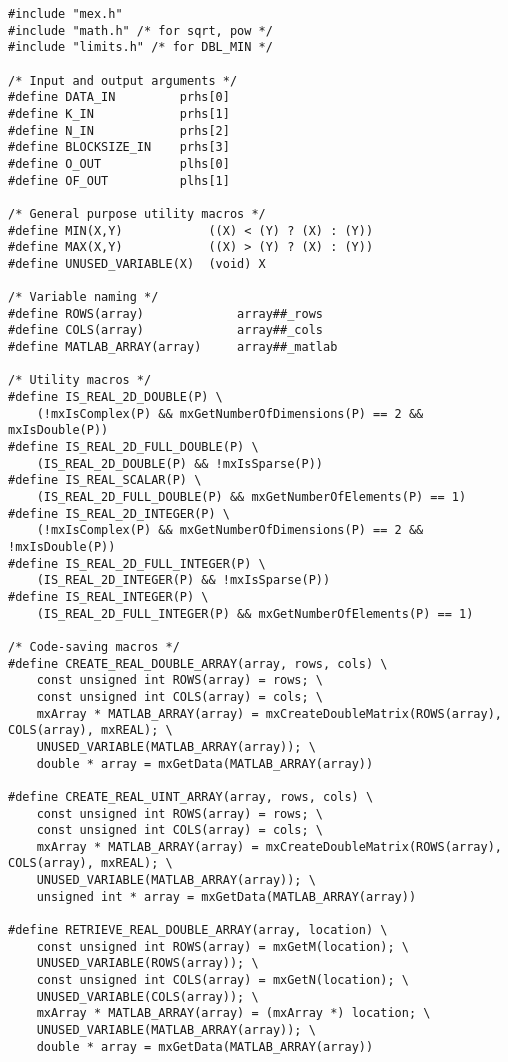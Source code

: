 \lstset{language=C}
\begin{lstlisting}
#include "mex.h"
#include "math.h" /* for sqrt, pow */
#include "limits.h" /* for DBL_MIN */

/* Input and output arguments */
#define DATA_IN         prhs[0]
#define K_IN            prhs[1]
#define N_IN            prhs[2]
#define BLOCKSIZE_IN    prhs[3]
#define O_OUT           plhs[0]
#define OF_OUT          plhs[1]

/* General purpose utility macros */
#define MIN(X,Y) 			((X) < (Y) ? (X) : (Y))
#define MAX(X,Y) 			((X) > (Y) ? (X) : (Y))
#define UNUSED_VARIABLE(X)	(void) X

/* Variable naming */
#define ROWS(array)				array##_rows
#define COLS(array) 			array##_cols
#define MATLAB_ARRAY(array)		array##_matlab

/* Utility macros */
#define IS_REAL_2D_DOUBLE(P) \
	(!mxIsComplex(P) && mxGetNumberOfDimensions(P) == 2 && mxIsDouble(P))
#define IS_REAL_2D_FULL_DOUBLE(P) \
	(IS_REAL_2D_DOUBLE(P) && !mxIsSparse(P))
#define IS_REAL_SCALAR(P) \
	(IS_REAL_2D_FULL_DOUBLE(P) && mxGetNumberOfElements(P) == 1)
#define IS_REAL_2D_INTEGER(P) \
	(!mxIsComplex(P) && mxGetNumberOfDimensions(P) == 2 && !mxIsDouble(P))
#define IS_REAL_2D_FULL_INTEGER(P) \
	(IS_REAL_2D_INTEGER(P) && !mxIsSparse(P))
#define IS_REAL_INTEGER(P) \
	(IS_REAL_2D_FULL_INTEGER(P) && mxGetNumberOfElements(P) == 1)

/* Code-saving macros */
#define CREATE_REAL_DOUBLE_ARRAY(array, rows, cols) \
	const unsigned int ROWS(array) = rows; \
	const unsigned int COLS(array) = cols; \
	mxArray * MATLAB_ARRAY(array) = mxCreateDoubleMatrix(ROWS(array), COLS(array), mxREAL); \
	UNUSED_VARIABLE(MATLAB_ARRAY(array)); \
	double * array = mxGetData(MATLAB_ARRAY(array))
	
#define CREATE_REAL_UINT_ARRAY(array, rows, cols) \
	const unsigned int ROWS(array) = rows; \
	const unsigned int COLS(array) = cols; \
	mxArray * MATLAB_ARRAY(array) = mxCreateDoubleMatrix(ROWS(array), COLS(array), mxREAL); \
	UNUSED_VARIABLE(MATLAB_ARRAY(array)); \
	unsigned int * array = mxGetData(MATLAB_ARRAY(array))
	
#define RETRIEVE_REAL_DOUBLE_ARRAY(array, location) \
	const unsigned int ROWS(array) = mxGetM(location); \
	UNUSED_VARIABLE(ROWS(array)); \
	const unsigned int COLS(array) = mxGetN(location); \
	UNUSED_VARIABLE(COLS(array)); \
	mxArray * MATLAB_ARRAY(array) = (mxArray *) location; \
	UNUSED_VARIABLE(MATLAB_ARRAY(array)); \
	double * array = mxGetData(MATLAB_ARRAY(array))
	

\end{lstlisting}
